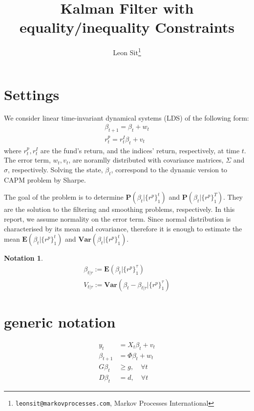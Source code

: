 \documentclass{article}
\title{Kalman Filter with equality/inequality Constraints}
\author{Leon Sit\footnote{\texttt{leonsit@markovprocesses.com}, Markov Processes International}}
\numberwithin{algorithm}{section}
\theoremstyle{plain}
\theoremstyle{definition}
\newtheorem{notation}[thm]{Notation}\small
\theoremstyle{remark}
\newcommand{\E}{\mathbf{E}}
\newcommand{\Var}{\mathbf{Var}}
\newcommand{\PP}{\mathbf{P}}
\begin{document}
\renewcommand{\baselinestretch}{1.5}

\maketitle
\tableofcontents
\listofalgorithms
\section{Settings}
We consider linear time-invariant dynamical systems (LDS) of the following form:
\begin{eqnarray}
\beta_{t+1} =  \beta_{t} + w_t\\
r^p_t = r^I_t \beta_t + v_t
\label{lds}
\end{eqnarray}
where $r^p_t, r^I_t$ are the fund's return, and the indices' return, respectively, at time $t$. The error term, $w_t, v_t$, are noramlly distributed with covariance matrices, $\Sigma$ and $\sigma$, respectively. Solving the state, $\beta_t$, correspond to the dynamic version to CAPM problem by Sharpe. 

The goal of the problem is to determine $\PP(\beta_t | \{ r^p\}_1^{t})$ and $\PP(\beta_t | \{ r^p\}_1^{T})$. They are the solution to the filtering and smoothing problems, respectively. In this report, we assume normality on the error term. Since normal distribution is characterised by its mean and covariance, therefore it is enough to estimate the mean $\E(\beta_t | \{ r^p\}_1^{t})$ and $\Var(\beta_t | \{ r^p\}_1^{t})$.

\begin{notation}
\begin{eqnarray*}
\beta_{t|\tau} := \E(\beta_t | \{ r^p \} ^ \tau _ 1 )\\
V_{t|\tau} := \Var(\beta_t - \beta_{t|\tau} | \{ r^p \} ^ \tau _ 1 ) 
\end{eqnarray*}
\end{notation}


\section{generic notation}
\begin{equation}
\begin{split}
y_t &= X_t \beta_t + v_t\\
\beta_{t+1} &= \Phi \beta_{t} + w_t\\
G \beta_t &\geq g, \quad \forall t\\
D \beta_t &= d, \quad \forall t
\end{split}
\end{equation}
\end{document}
